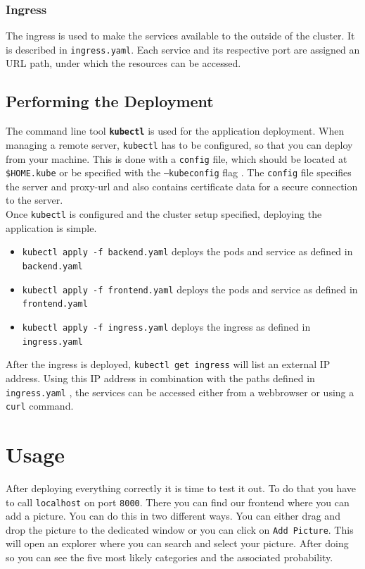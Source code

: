        \subsubsection{Ingress}
            The ingress is used to make the services available to the outside of the cluster.
            It is described in \texttt{ingress.yaml}.
            Each service and its respective port are assigned an URL path, under which the resources can be accessed. 
        
    \subsection{Performing the Deployment}
        The command line tool \textbf{\texttt{kubectl}} is used for the application deployment.
        When managing a remote server, \texttt{kubectl} has to be configured, so that you can deploy from your machine.
        This is done with a \texttt{config} file, which should be located at \texttt{\$HOME\/.kube} or be specified with the \texttt{--kubeconfig} flag \cite{Kubernetes_kubeconfig:2022}.
        The \texttt{config} file specifies the server and proxy-url and also contains certificate data for a secure connection to the server.
        \medskip\\
        Once \texttt{kubectl} is configured and the cluster setup specified, deploying the application is simple.
        \begin{itemize}
            \item \texttt{kubectl apply -f backend.yaml} deploys the pods and service as defined in \texttt{backend.yaml}
            \item \texttt{kubectl apply -f frontend.yaml} deploys the pods and service as defined in \texttt{frontend.yaml}
             \item \texttt{kubectl apply -f ingress.yaml} deploys the ingress as defined in \texttt{ingress.yaml}
        \end{itemize}
        After the ingress is deployed, \texttt{kubectl get ingress} will list an external IP address.
        Using this IP address in combination with the paths defined in \texttt{ingress.yaml} , the services can be accessed either from a webbrowser or using a \texttt{curl} command.
    
\section{Usage}
After deploying everything correctly it is time to test it out. To do that you have to call \texttt{localhost} on port \texttt{8000}. There you can find our frontend where you can add a picture. You can do this in two different ways. You can either drag and drop the picture to the dedicated window or you can click on \texttt{Add Picture}. This will open an explorer where you can search and select your picture. After doing so you can see the five most likely categories and the associated probability.